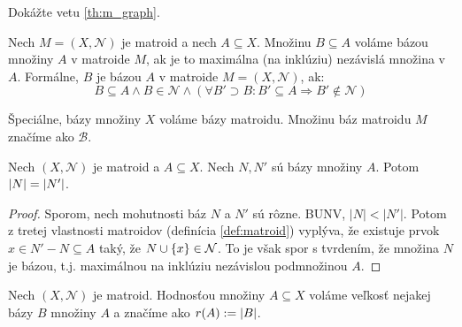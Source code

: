 \begin{exercise}
\label{ex:m_graph}
Dokážte vetu \ref{th:m_graph}.
\end{exercise}

\begin{definition}
Nech $M = (X, \mathcal{N})$ je matroid a nech $A \subseteq X$. Množinu $B \subseteq A$ voláme bázou množiny $A$ v matroide $M$, ak 
je to maximálna (na inklúziu) nezávislá množina v $A$. Formálne, $B$ je bázou $A$ v matroide $M=(X, \mathcal{N})$, ak:
$$B \subseteq A \wedge B \in \mathcal{N} \wedge \left( \forall B' \supset B: B' \subseteq A \Longrightarrow B' \not\in\mathcal{N} \right)$$

Špeciálne, bázy množiny $X$ voláme bázy matroidu. Množinu báz matroidu $M$ značíme ako $\mathcal{B}$.
\end{definition}

\begin{theorem}
Nech $(X, \mathcal{N})$ je matroid a $A \subseteq X$. Nech $N, N'$ sú bázy množiny $A$. Potom $\left|N\right| = \left|N'\right|$.
\end{theorem}
\begin{proof}
Sporom, nech mohutnosti báz $N$ a $N'$ sú rôzne.
BUNV, $|N| < |N'|$.
Potom z tretej vlastnosti matroidov (definícia \ref{def:matroid}) vyplýva, že existuje prvok $x \in N' - N \subseteq A$ taký, že $N \cup \left\{x\right\} \in \mathcal{N}$.
To je však spor s tvrdením, že množina $N$ je bázou, t.j. maximálnou na inklúziu nezávislou podmnožinou $A$.
\end{proof}

\begin{definition}
Nech $(X, \mathcal{N})$ je matroid. Hodnosťou množiny $A \subseteq X$ voláme veľkosť nejakej bázy $B$ množiny $A$ a značíme ako $r(A) := \left|B\right|$.
\end{definition}

